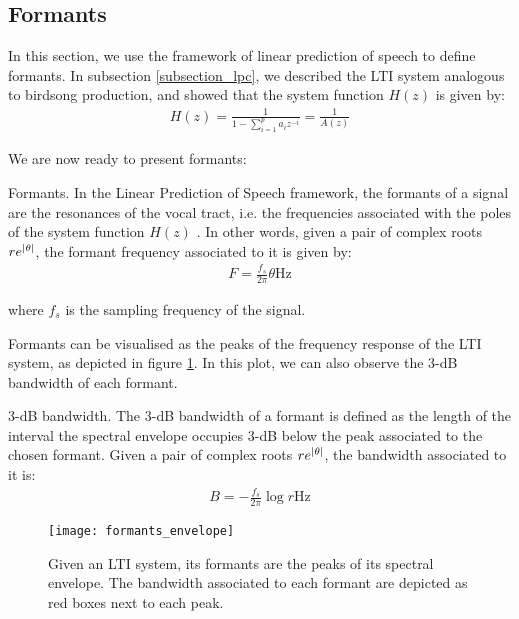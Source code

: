 \documentclass[../main.tex]{subfiles}
\begin{document}
\subsection{Formants} \label{subsection_fmnts}
\par In this section, we use the framework of linear prediction of speech to define formants. In subsection \ref{subsection_lpc}, we described the LTI system analogous to birdsong production, and showed that the system function $H(z)$ is given by:
\begin{align*}
H(z) = \frac{1}{1 - \sum_{i=1}^pa_iz^{-i}} = \frac{1}{A(z)}
\end{align*}
\par We are now ready to present formants:
\begin{definition}{Formants.} \label{def_formants}
In the Linear Prediction of Speech framework, the formants of a signal are the resonances of the vocal tract, i.e. the frequencies associated with the poles of the system function $H(z)$ \cite{Snell1993}. In other words, given a pair of complex roots $re^{\lvert\theta\rvert}$, the formant frequency associated to it is given by:
\begin{align*}
F = \frac{f_s}{2\pi}\theta \text{Hz}
\end{align*}
\end{definition}
\par where $f_s$ is the sampling frequency of the signal. 
\par Formants can be visualised as the peaks of the frequency response of the LTI system, as depicted in figure \ref{fig_fmnts_lpc}. In this plot, we can also observe the 3-dB bandwidth of each formant. 
\begin{definition}{3-dB bandwidth.}\label{def_bandwidth}
The 3-dB bandwidth of a formant is defined as the length of the interval the spectral envelope occupies 3-dB below the peak associated to the chosen formant. Given a pair of complex roots $re^{\lvert\theta\rvert}$, the bandwidth associated to it is:
\begin{align*}
B = -\frac{f_s}{2\pi}\log{r} \text{Hz}
\end{align*}
\end{definition}
\begin{figure}[t]
\centering
\texttt{[image: formants\_envelope]}
\caption{Given an LTI system, its formants are the peaks of its spectral envelope. The bandwidth associated to each formant are depicted as red boxes next to each peak.}
\label{fig_fmnts_lpc}
\end{figure}
\end{document}
